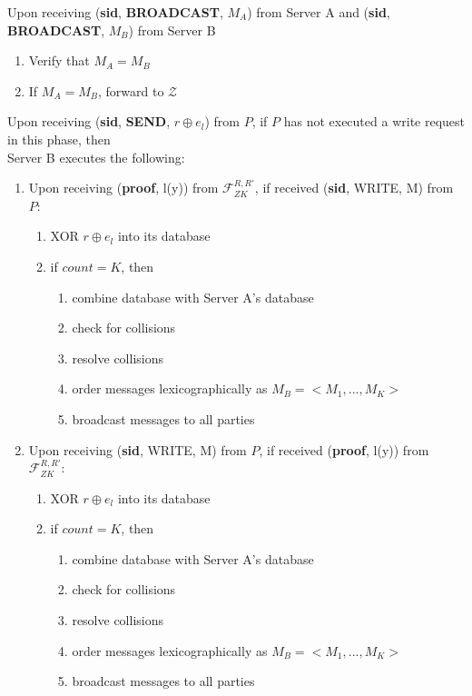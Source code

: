 \begin{tcolorbox}[colback=white, arc=5pt]
\extitem Upon receiving (\textbf{sid}, \textbf{BROADCAST}, $M_A$) from Server A and (\textbf{sid}, \textbf{BROADCAST}, $M_B$) from Server B
\begin{enumerate}
    \item Verify that $M_A = M_B$
    \item If $M_A = M_B$, forward to $\mathcal{Z}$
\end{enumerate}

\extitem Upon receiving (\textbf{sid}, \textbf{SEND}, $r\oplus e_l$) from $P$, if $P$ has not executed a write request in this phase, then \\
    Server B executes the following:
    
    \begin{enumerate}
        \item Upon receiving (\textbf{proof}, l(y)) from $\mathcal{F}_{ZK}^{R,R'}$, if received (\textbf{sid}, WRITE, M) from $P$:
        \begin{enumerate}
            \item XOR $r\oplus e_l$ into its database  
            \item if $count=K$, then
            \begin{enumerate}
                \item combine database with Server A's database
                \item check for collisions
                \item resolve collisions
                \item order messages lexicographically as $M_B=<M_1,...,M_K>$
                \item broadcast messages to all parties
            \end{enumerate}
        \end{enumerate}
        \item Upon receiving (\textbf{sid}, WRITE, M) from $P$, if received (\textbf{proof}, l(y)) from $\mathcal{F}_{ZK}^{R,R'}$:
        \begin{enumerate}
            \item XOR $r\oplus e_l$ into its database  
            \item if $count=K$, then
            \begin{enumerate}
                \item combine database with Server A's database
                \item check for collisions
                \item resolve collisions
                \item order messages lexicographically as $M_B=<M_1,...,M_K>$
                \item broadcast messages to all parties
            \end{enumerate}
        \end{enumerate}
    \end{enumerate}


\end{tcolorbox}
